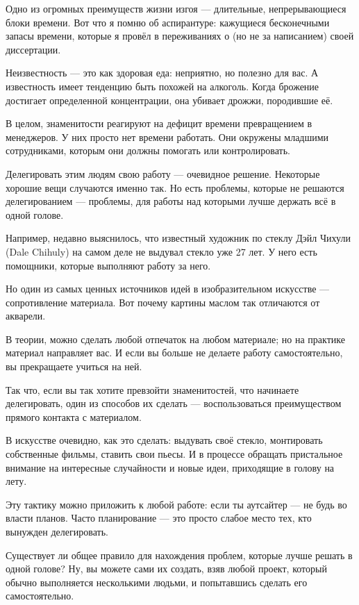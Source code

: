 \documentclass[ebook,12pt,oneside,openany]{memoir}
\begin{document}
Одно из огромных преимуществ жизни изгоя — длительные, непрерывающиеся
блоки времени. Вот что я помню об аспирантуре: кажущиеся бесконечными
запасы времени, которые я провёл в переживаниях о (но не за
написанием) своей диссертации.

Неизвестность — это как здоровая еда: неприятно, но полезно для вас. А
известность имеет тенденцию быть похожей на алкоголь. Когда брожение
достигает определенной концентрации, она убивает дрожжи, породившие
её.

В целом, знаменитости реагируют на дефицит времени превращением в
менеджеров. У них просто нет времени работать. Они окружены младшими
сотрудниками, которым они должны помогать или контролировать.

Делегировать этим людям свою работу — очевидное решение. Некоторые
хорошие вещи случаются именно так. Но есть проблемы, которые не
решаются делегированием — проблемы, для работы над которыми лучше
держать всё в одной голове.

Например, недавно выяснилось, что известный художник по стеклу Дэйл
Чихули (Dale Chihuly) на самом деле не выдувал стекло уже 27 лет. У
него есть помощники, которые выполняют работу за него.

Но один из самых ценных источников идей в изобразительном искусстве —
сопротивление материала. Вот почему картины маслом так отличаются от
акварели.

В теории, можно сделать любой отпечаток на любом материале; но на
практике материал направляет вас. И если вы больше не делаете работу
самостоятельно, вы прекращаете учиться на ней.

Так что, если вы так хотите превзойти знаменитостей, что начинаете
делегировать, один из способов их сделать — воспользоваться
преимуществом прямого контакта с материалом.

В искусстве очевидно, как это сделать: выдувать своё стекло,
монтировать собственные фильмы, ставить свои пьесы. И в процессе
обращать пристальное внимание на интересные случайности и новые идеи,
приходящие в голову на лету.

Эту тактику можно приложить к любой работе: если ты аутсайтер — не
будь во власти планов. Часто планирование — это просто слабое место
тех, кто вынужден делегировать.

Существует ли общее правило для нахождения проблем, которые лучше
решать в одной голове? Ну, вы можете сами их создать, взяв любой
проект, который обычно выполняется несколькими людьми, и попытавшись
сделать его самостоятельно.
\end{document}
